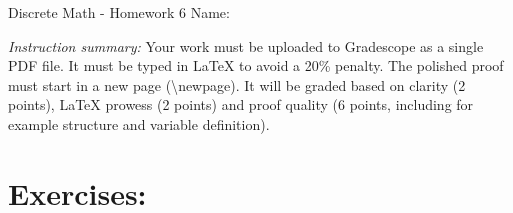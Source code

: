 \documentclass[11pt]{article}
\begin{document}
\begin{center}
	{\LARGE Discrete Math - Homework 6} \Large \newline
    Name:
\end{center}

\emph{Instruction summary:} Your work must be uploaded to Gradescope as a single PDF file. It must be typed in LaTeX to avoid a 20\% penalty. The polished proof must start in a new page (\textbackslash{newpage}). It will be graded based on clarity (2 points), LaTeX prowess (2 points) and proof quality (6 points, including for example structure and variable definition).

\section*{Exercises:}
\end{document}
